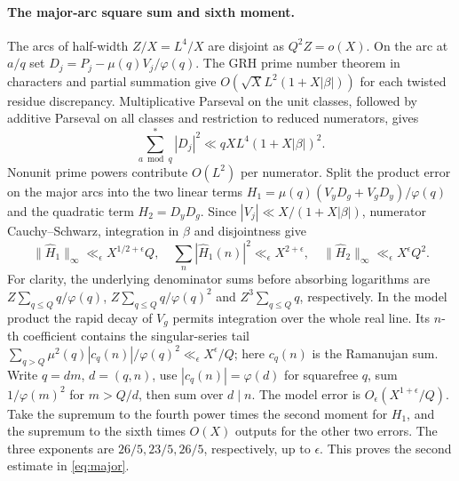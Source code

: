 \documentclass[11pt,a4paper]{article}
\begin{document}
\paragraph{The major-arc square sum and sixth moment.}
The arcs of half-width \(Z/X=L^4/X\) are disjoint as \(Q^2 Z=o(X)\). On the arc at \(a/q\) set \(D_j=P_j-\mu(q)V_j/\varphi(q)\). The GRH prime number theorem in characters and partial summation give \(O(\sqrt X L^2(1+X|\beta|))\) for each twisted residue discrepancy. Multiplicative Parseval on the unit classes, followed by additive Parseval on all classes and restriction to reduced numerators, gives
\[
 \sum_{a\bmod q}^* |D_j|^2\ll qX L^4(1+X|\beta|)^2 .
\]
Nonunit prime powers contribute \(O(L^2)\) per numerator. Split the product error on the major arcs into the two linear terms \(H_1=\mu(q)(V_y D_g+V_gD_y)/\varphi(q)\) and the quadratic term \(H_2=D_yD_g\). Since \(|V_j|\ll X/(1+X|\beta|)\), numerator Cauchy--Schwarz, integration in \(\beta\) and disjointness give
\[
 \|\widehat H_1\|_\infty\ll_\epsilon X^{1/2+\epsilon}Q,\quad
 \sum_n|\widehat H_1(n)|^2\ll_\epsilon X^{2+\epsilon},\quad
 \|\widehat H_2\|_\infty\ll_\epsilon X^\epsilon Q^2 .
\]
For clarity, the underlying denominator sums before absorbing logarithms are \(Z\sum_{q\le Q}q/\varphi(q)\), \(Z\sum_{q\le Q}q/\varphi(q)^2\) and \(Z^3\sum_{q\le Q}q\), respectively. In the model product the rapid decay of \(V_g\) permits integration over the whole real line. Its \(n\)-th coefficient contains the singular-series tail \(\sum_{q>Q}\mu^2(q)|c_q(n)|/\varphi(q)^2\ll_\epsilon X^\epsilon/Q\); here \(c_q(n)\) is the Ramanujan sum. Write \(q=dm\), \(d=(q,n)\), use \(|c_q(n)|=\varphi(d)\) for squarefree \(q\), sum \(1/\varphi(m)^2\) for \(m>Q/d\), then sum over \(d\mid n\). The model error is \(O_\epsilon(X^{1+\epsilon}/Q)\). Take the supremum to the fourth power times the second moment for \(H_1\), and the supremum to the sixth times \(O(X)\) outputs for the other two errors. The three exponents are \(26/5,23/5,26/5\), respectively, up to \(\epsilon\). This proves the second estimate in \eqref{eq:major}.
\end{document}

